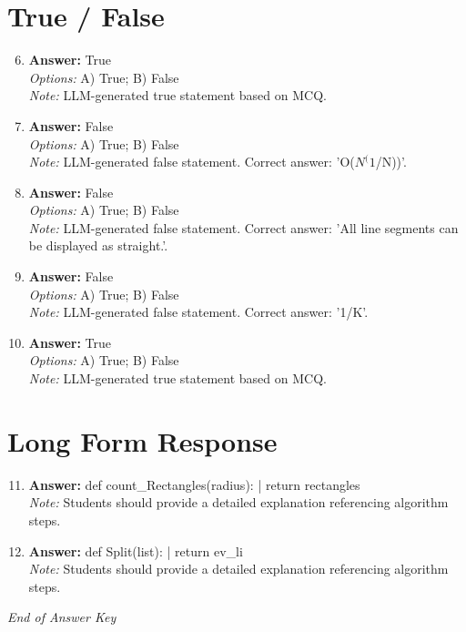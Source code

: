 \documentclass[12pt]{article}
\begin{document}
\section*{True / False}
\begin{enumerate}[label=\arabic*.]
\setcounter{enumi}{5}
\item \textbf{Answer:} True
\\ \textit{Options:} A) True; B) False
\\ \textit{Note:} LLM-generated true statement based on MCQ.
\item \textbf{Answer:} False
\\ \textit{Options:} A) True; B) False
\\ \textit{Note:} LLM-generated false statement. Correct answer: 'O($N^(1$/N))'.
\item \textbf{Answer:} False
\\ \textit{Options:} A) True; B) False
\\ \textit{Note:} LLM-generated false statement. Correct answer: 'All line segments can be displayed as straight.'.
\item \textbf{Answer:} False
\\ \textit{Options:} A) True; B) False
\\ \textit{Note:} LLM-generated false statement. Correct answer: '1/K'.
\item \textbf{Answer:} True
\\ \textit{Options:} A) True; B) False
\\ \textit{Note:} LLM-generated true statement based on MCQ.
\end{enumerate}

\section*{Long Form Response}
\begin{enumerate}[label=\arabic*.]
\setcounter{enumi}{10}
\item \textbf{Answer:} def count\_Rectangles(radius): | return rectangles
\\ \textit{Note:} Students should provide a detailed explanation referencing algorithm steps.
\item \textbf{Answer:} def Split(list): | return ev\_li
\\ \textit{Note:} Students should provide a detailed explanation referencing algorithm steps.
\end{enumerate}

\vfill
\noindent\textit{End of Answer Key}
\end{document}
